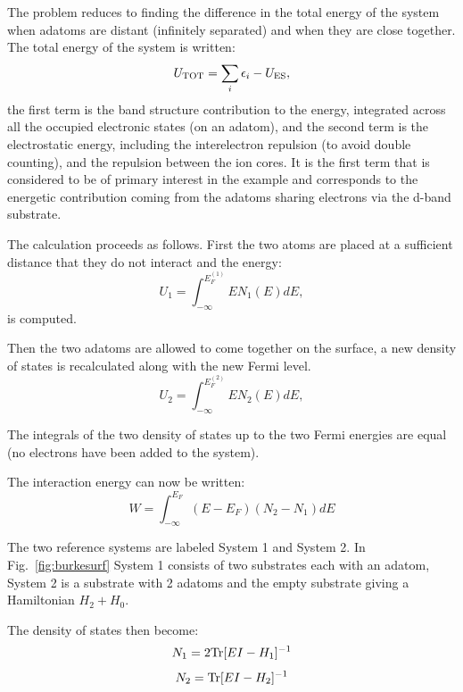 The problem reduces to finding the difference in the total energy of the system when
adatoms are distant (infinitely separated) and when they are close together.
The total energy of the system is written:
%
\begin{equation}
U_{\rm TOT} = \sum_{i}\epsilon_{i} - U_{\rm ES},
\end{equation}
%
the first term is the band structure contribution to the energy, integrated
across all the occupied electronic states (on an adatom), and the second term is the electrostatic
energy, including the interelectron repulsion (to avoid double counting), and the repulsion
between the ion cores. It is the first term that is considered to be of primary 
interest in the example and corresponds to the energetic contribution coming 
from the adatoms sharing electrons via the d-band substrate.

The calculation proceeds as follows. First the two atoms are placed at a sufficient
distance that they do not interact and the energy:
%
\begin{equation}
U_{1} = \int_{-\infty}^{E^{(1)}_{F}}EN_{1}(E)dE,
\end{equation}
%
is computed. 

Then the two adatoms are allowed to come together on the surface, 
a new density of states is recalculated along with the new Fermi level.
%
\begin{equation}
U_{2} = \int_{-\infty}^{E^{(2)}_{F}}EN_{2}(E)dE,
\end{equation}

The integrals of the two density of states up to the two Fermi energies are equal
(no electrons have been added to the system).

The interaction energy can now be written:
%
\begin{equation}
W = \int_{-\infty}^{E_{F}} (E-E_{F})(N_{2}-N_{1}) dE
\end{equation}
%

The two reference systems are labeled System 1 and System 2. In Fig.~\ref{fig:burkesurf}
System 1 consists of two substrates each with an adatom, System 2 is a substrate with
2 adatoms and the empty substrate giving a Hamiltonian $H_{2}+H_{0}$.

The density of states then become:
%
\begin{equation}
N_{1} = 2{\rm Tr}[EI-H_{1}]^{-1}
\end{equation}
%
\begin{equation}
N_{2} = {\rm Tr}[EI-H_{2}]^{-1}
\end{equation}

